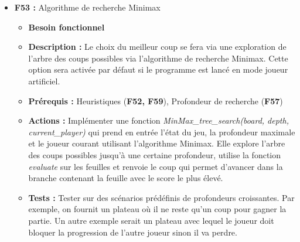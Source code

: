 \documentclass{article}
\begin{document}
\begin{itemize}
\begin{itemize}
        \item \textbf{Actions :} Implémenter une fonction \textit{evaluate(game\_state, move)} qui renvoie le score selon la configuration actuelle du plateau et un coup possible à jouer. On pourra, dans un premier temps, implémenter l’heuristique Y-réduction avec des probabilités de possession \cite{RJ02}. Le principe est d’utiliser la structure obtenue avec la réduction, mais, à la place de pairs de bits pour le codage, les cases vides sont représentées par une probabilité $p_1 = 0.5$, les cases possédées par Ami ont une probabilité $p_2$ = 1 et les cases possédées par Ennemi ont une probabilité $p_3 = 0$. Pour chaque triplet, la nouvelle opération est $q = 1/2 (p1 + p2 + p3 - p1p2p3)$. L’évaluation finale d’un coup est : $\frac{\partial v}{\partial q}.\frac{1}{2}(1-p_2p_3)$
        \item \textbf{Tests :} Vérifier la valeur de certaines configurations de plateau. Comparer le résultat, pour les 2 joueurs, d’un nœud avantageux pour un joueur.
    \end{itemize}
\bigskip
    \item \label{minimax} \textbf{F53 :} Algorithme de recherche Minimax
    \begin{itemize}
        \item \textbf{Besoin fonctionnel}
        \item \textbf{Description :} Le choix du meilleur coup se fera via une exploration de l’arbre des coups possibles via l’algorithme de recherche Minimax. Cette option sera activée par défaut si le programme est lancé en mode joueur artificiel.
        \item \textbf{Prérequis :} Heuristiques (\textbf{F52, F59}), Profondeur de recherche (\textbf{F57})
        \item \textbf{Actions :} Implémenter une fonction \textit{MinMax\_tree\_search(board, depth, current\_player)} qui prend en entrée l’état du jeu, la profondeur maximale et le joueur courant utilisant l’algorithme Minimax. Elle explore l’arbre des coups possibles jusqu’à une certaine profondeur, utilise la fonction \textit{evaluate} sur les feuilles et renvoie le coup qui permet d’avancer dans la branche contenant la feuille avec le score le plus élevé.
        \item \textbf{Tests :} Tester sur des scénarios prédéfinis de profondeurs croissantes. Par exemple, on fournit un plateau où il ne reste qu’un coup pour gagner la partie. Un autre exemple serait un plateau avec lequel le joueur doit bloquer la progression de l’autre joueur sinon il va perdre.

\end{itemize}
\end{itemize}
\end{document}
